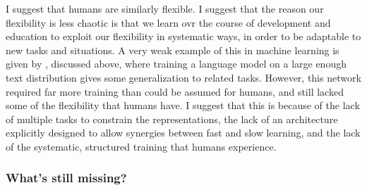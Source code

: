 \documentclass[11pt]{article}
\begin{document}
I suggest that humans are similarly flexible. I suggest that the reason our flexibility is less chaotic is that we learn ovr the course of development and education to exploit our flexibility in systematic ways, in order to be adaptable to new tasks and situations. A very weak example of this in machine learning is given by \citet{Radford2019}, discussed above, where training a language model on a large enough text distribution gives some generalization to related tasks. However, this network required far more training than could be assumed for humans, and still lacked some of the flexibility that humans have. I suggest that this is because of the lack of multiple tasks to constrain the representations, the lack of an architecture explicitly designed to allow synergies between fast and slow learning, and the lack of the systematic, structured training that humans experience. \par 

\subsubsection{What's still missing?}
\end{document}
